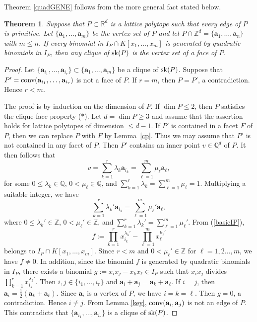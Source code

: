\documentclass[12pt]{amsart}
\newtheorem{thm}{Theorem} [section]
\theoremstyle{definition}
\numberwithin{thm}{section}
\numberwithin{equation}{section}
\def\NZQ{\mathbb}               %
\def\QQ{{\NZQ Q}}
\def\ZZ{{\NZQ Z}}
\def\RR{{\NZQ R}}
\def\ab{{\mathbf a}}
\begin{document}
Theorem \ref{quadGENE} follows from the more general fact stated below.

\begin{thm}\label{more general fact}
Suppose that  $P \subset \RR^d$ is a lattice polytope 
such that every edge of $P$ is primitive.
Let $\{\ab_1,\ldots,\ab_m\}$ be the vertex set of $P$ and let
$P \cap \ZZ^d = \{\ab_1,\ldots,\ab_n\}$ with $m \le n$.
If every binomial in $I_P \cap K[x_1,\dots,x_m]$ is generated by quadratic binomials in $I_P$, then any clique of ${\rm sk}(P)$ is the vertex set of a face of $P$.
\end{thm}

\begin{proof}
Let $\{\ab_{i_1} ,\dots,  \ab_{i_r}\} \subset \{\ab_1 ,\dots,  \ab_m\}$ be a clique 
of ${\rm sk}(P)$.
Suppose that 
$P'= {\rm conv}(\ab_{i_1} ,\dots,  \ab_{i_r})$ 
is not a face of $P$.
If $r=m$,
then 
$P=P'$,
a contradiction.
Hence $r<m$.

The proof is by induction on the dimension of $P$.
If $\dim P \le 2$, then $P$ satisfies the clique-face property ($*$).
Let $d=\dim P \ge 3$ and assume that the assertion holds for lattice polytopes of dimension $\le d-1$.
If $P'$ is contained in a facet $F$ of $P$,
then we can replace $P$ with $F$ by Lemma~\ref{cp}.
Thus we may assume that $P'$ is not contained in any facet of $P$.
Then $P'$ contains an inner point $v \in \QQ^d$ of $P$.
It then follows that
\[
v = \sum_{k=1}^r \lambda_k \ab_{i_k}
=\sum_{\ell=1}^m \mu_\ell \ab_\ell,
\]
for some $0 \leq \lambda_k \in \QQ$, $0 < \mu_\ell \in \QQ$,
and $\sum_{k=1}^r \lambda_k = \sum_{\ell=1}^m \mu_\ell = 1$.
Multiplying a suitable integer,
we have
\[
\sum_{k=1}^r \lambda_k' \ab_{i_k}
=\sum_{\ell=1}^m \mu_\ell' \ab_\ell,
\]
where 
$0 \leq \lambda_k' \in \ZZ$, $0 < \mu_\ell' \in \ZZ$,
and $\sum_{k=1}^r \lambda_k' = \sum_{\ell=1}^m \mu_\ell'$.
From (\ref{basicIP}),
    $$
    f:=
\prod_{k=1}^r x_{i_k}^{ \lambda_k'}
-
\prod_{\ell=1}^m x_\ell^{\mu_\ell'}  
$$
belongs to $I_P \cap K[x_1,\dots,x_m]$.
Since $r<m$ and $0 < \mu_\ell' \in \ZZ$ for $\ell = 1,2 \dots, m$, we have $f \ne 0$.
In addition, since the binomial $f$ is generated by quadratic binomials in $I_P$, there exists a binomial
$g:=x_i x_j - x_k x_\ell \in I_P$ 
such that $x_i x_j$ divides $\prod_{k=1}^r x_{i_k}^{ \lambda_k'}$.
Then $i,j \in \{i_1,\dots,i_r\}$
and $\ab_i + \ab_j = \ab_k + \ab_\ell$.
If $i = j$, then  $\ab_i  = \frac{1}{2}( \ab_k + \ab_\ell)$.
Since $\ab_i$ is a vertex of $P$, we have $i =k = \ell$.
Then $g = 0$, a contradiction.
Hence $i \ne j$.
From Lemma \ref{key},  ${\rm conv}(\ab_i , \ab_j)$ is not an edge of $P$.
This contradicts that
$\{\ab_{i_1} ,\dots,  \ab_{i_r}\}$ is a clique of ${\rm sk}(P)$.
\end{proof}
\end{document}
